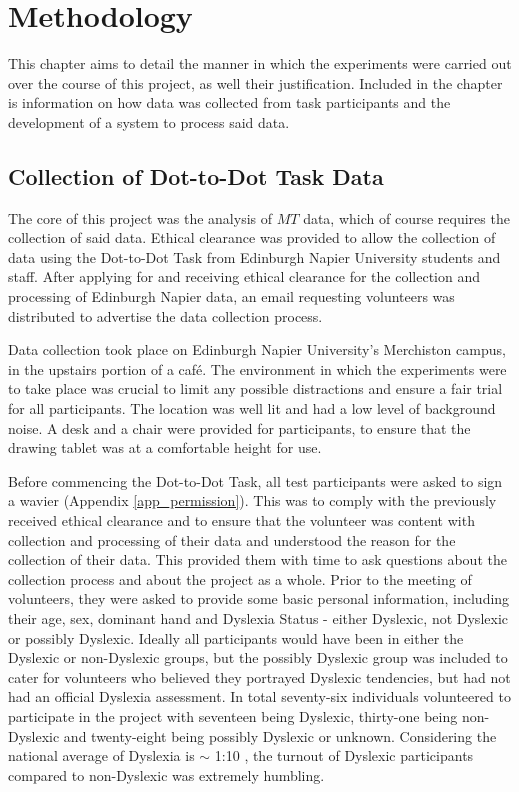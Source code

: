 \section{Methodology}
	This chapter aims to detail the manner in which the experiments were carried out over the course of this project, as well their justification. Included in the chapter is information on how data was collected from task participants and the development of a system to process said data.

	\subsection{Collection of Dot-to-Dot Task Data}
		The core of this project was the analysis of \(MT\) data, which of course requires  the collection of said data. Ethical clearance was provided to allow the collection of data using the Dot-to-Dot Task from Edinburgh Napier University students and staff. After applying for and receiving ethical clearance for the collection and processing of Edinburgh Napier data, an email requesting volunteers was distributed to advertise the data collection process.
	
		Data collection took place on Edinburgh Napier University’s Merchiston campus, in the upstairs portion of a café. The environment in which the experiments were to take place was crucial to limit any possible distractions and ensure a fair trial for all participants. The location was well lit and had a low level of background noise. A desk and a chair were provided for participants, to ensure that the drawing tablet was at a comfortable height for use. 
	
		Before commencing the Dot-to-Dot Task, all test participants were asked to sign a wavier (Appendix \ref{app_permission}). This was to comply with the previously received ethical clearance and to ensure that the volunteer was content with collection and processing of their data and understood the reason for the collection of their data. This provided them with time to ask questions about the collection process and about the project as a whole. Prior to the meeting of volunteers, they were asked to provide some basic personal information, including their age, sex, dominant hand and Dyslexia Status - either Dyslexic, not Dyslexic or possibly Dyslexic. Ideally all participants would have been in either the Dyslexic or non-Dyslexic groups, but the possibly Dyslexic group was included to cater for volunteers who believed they portrayed Dyslexic tendencies, but had not had an official Dyslexia assessment. In total seventy-six individuals volunteered to participate in the project with seventeen being Dyslexic, thirty-one being non-Dyslexic and twenty-eight being possibly Dyslexic or unknown. Considering the national average of Dyslexia is $\sim$ 1:10	\cite{BritishDyslexiaAssociation2016}, the turnout of Dyslexic participants compared to non-Dyslexic was extremely humbling.
	

